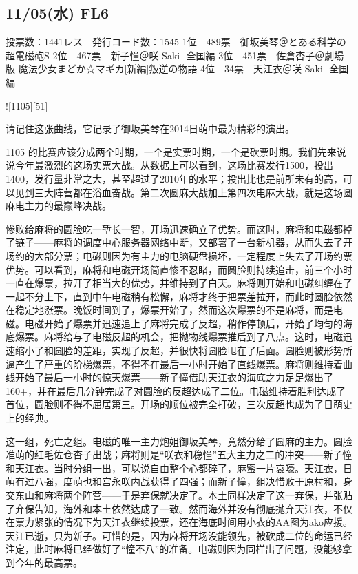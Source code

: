 \subsection{11/05(水) FL6}

    投票数：1441レス　発行コード数：1545
    1位　489票　御坂美琴＠とある科学の超電磁砲S
    2位　467票　新子憧＠咲-Saki- 全国編
    3位　451票　佐倉杏子＠劇場版 魔法少女まどか☆マギカ[新編]叛逆の物語
    4位　34票　天江衣＠咲-Saki- 全国編

![1105][51]

请记住这张曲线，它记录了御坂美琴在2014日萌中最为精彩的演出。

1105 的比赛应该分成两个时期，一个是实票时期，一个是砍票时期。我们先来说说今年最激烈的这场实票大战。从数据上可以看到，这场比赛发行1500，投出1400，发行量非常之大，甚至超过了2010年的水平；投出比也是前所未有的高，可以见到三大阵营都在浴血奋战。第二次圆麻大战加上第四次电麻大战，就是这场圆麻电主力的最巅峰决战。

惨败给麻将的圆脸吃一堑长一智，开场迅速确立了优势。而这时，麻将和电磁都掉了链子——麻将的调度中心服务器网络中断，又部署了一台新机器，从而失去了开场约的大部分票；电磁则因为有主力的电脑硬盘损坏，一定程度上失去了开场约票优势。可以看到，麻将和电磁开场简直惨不忍睹，而圆脸则持续追击，前三个小时一直在爆票，拉开了相当大的优势，并维持到了白天。麻将则开始和电磁纠缠在了一起不分上下，直到中午电磁稍有松懈，麻将才终于把票差拉开，而此时圆脸依然在稳定地涨票。晚饭时间到了，爆票开始了，然而这次爆票的不是麻将，而是电磁。电磁开始了爆票并迅速追上了麻将完成了反超，稍作停顿后，开始了均匀的海底爆票。麻将给与了电磁反超的机会，把抛物线爆票推后到了八点。这时，电磁迅速缩小了和圆脸的差距，实现了反超，并很快将圆脸甩在了后面。圆脸则被形势所逼产生了严重的阶梯爆票，不得不在最后一小时开始了直线爆票。麻将则维持着曲线开始了最后一小时的惊天爆票——新子憧借助天江衣的海底之力足足爆出了160+，并在最后几分钟完成了对圆脸的反超达成了二位。电磁维持着胜利达成了首位，圆脸则不得不屈居第三。开场的顺位被完全打破，三次反超也成为了日萌史上的经典。

这一组，死亡之组。电磁的唯一主力炮姐御坂美琴，竟然分给了圆麻的主力。圆脸准萌的红毛佐仓杏子出战；麻将则是“咲衣和稳憧”五大主力之二的冲突——新子憧和天江衣。当时分组一出，可以说自由整个心都碎了，麻蜜一片哀嚎。天江衣，日萌有过八强，度萌也和宫永咲内战获得了四强；而新子憧，组决惜败于原村和，身交东山和麻将两个阵营——于是弃保就决定了。本土同样决定了这一弃保，并张贴了弃保告知，海外和本土依然达成了一致。然而海外并没有彻底抛弃天江衣，不仅在票力紧张的情况下为天江衣继续投票，还在海底时间用小衣的AA图为ako应援。天江已逝，只为新子。可惜的是，因为麻将开场没能领先，被砍成二位的命运已经注定，此时麻将已经做好了“憧不八”的准备。电磁则因为同样出了问题，没能够拿到今年的最高票。

